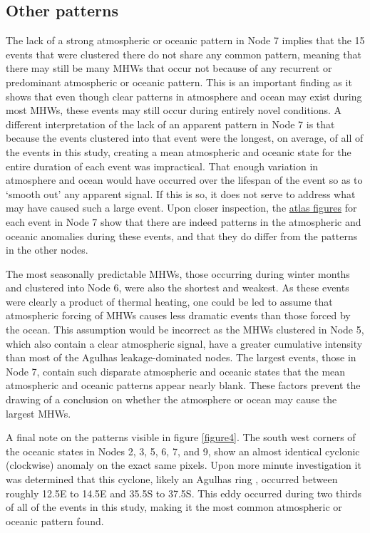 \documentclass[utf8]{frontiersSCNS}
\begin{document}
\subsection{Other patterns}
The lack of a strong atmospheric or oceanic pattern in Node 7 implies that the 15 events that were clustered there do not share any common pattern, meaning that there may still be many MHWs that occur not because of any recurrent or predominant atmospheric or oceanic pattern. This is an important finding as it shows that even though clear patterns in atmosphere and ocean may exist during most MHWs, these events may still occur during entirely novel conditions. A different interpretation of the lack of an apparent pattern in Node 7 is that because the events clustered into that event were the longest, on average, of all of the events in this study, creating a mean atmospheric and oceanic state for the entire duration of each event was impractical. That enough variation in atmosphere and ocean would have occurred over the lifespan of the event so as to `smooth out' any apparent signal. If this is so, it does not serve to address what may have caused such a large event. Upon closer inspection, the \href{https://github.com/schrob040/AHW/tree/master/graph/synoptic}{atlas figures} for each event in Node 7 show that there are indeed patterns in the atmospheric and oceanic anomalies during these events, and that they do differ from the patterns in the other nodes.

The most seasonally predictable MHWs, those occurring during winter months and clustered into Node 6, were also the shortest and weakest. As these events were clearly a product of thermal heating, one could be led to assume that atmospheric forcing of MHWs causes less dramatic events than those forced by the ocean. This assumption would be incorrect as the MHWs clustered in Node 5, which also contain a clear atmospheric signal, have a greater cumulative intensity than most of the Agulhas leakage-dominated nodes. The largest events, those in Node 7, contain such disparate atmospheric and oceanic states that the mean atmospheric and oceanic patterns appear nearly blank. These factors prevent the drawing of a conclusion on whether the atmosphere or ocean may cause the largest MHWs.

A final note on the patterns visible in figure \ref{figure4}. The south west corners of the oceanic states in Nodes 2, 3, 5, 6, 7, and 9, show an almost identical cyclonic (clockwise) anomaly on the exact same pixels. Upon more minute investigation it was determined that this cyclone, likely an Agulhas ring \citep{Hutchings2009}, occurred between roughly 12.5\degree E to 14.5\degree E and 35.5\degree S to 37.5\degree S. This eddy occurred during two thirds of all of the events in this study, making it the most common atmospheric or oceanic pattern found.
\end{document}
